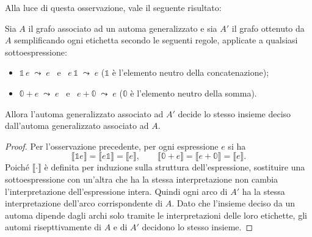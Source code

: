 Alla luce di questa osservazione, vale il seguente risultato:
\begin{prop}
Sia $A$ il grafo associato ad un automa 
generalizzato e sia $A'$ il grafo ottenuto da $A$
semplificando ogni etichetta secondo le seguenti regole, applicate a
qualsiasi sottoespressione:
\begin{itemize}
    \item $\mathbb 1\, e \;\leadsto\; e$ \ e \ $e\, \mathbb 1 \;\leadsto\; e$
          \quad ($\mathbb 1$ è l'elemento neutro della concatenazione);
    \item $\mathbb 0 + e \;\leadsto\; e$ \ e \ $e + \mathbb 0 \;\leadsto\; e$
          \quad ($\mathbb 0$ è l'elemento neutro della somma).
\end{itemize}
Allora l'automa generalizzato associato ad $A'$ decide lo stesso insieme
deciso dall'automa generalizzato associato ad $A$.
\begin{proof}
Per l'osservazione precedente, per ogni espressione $e$ si ha
\[
\llbracket \mathbb 1 e \rrbracket
= \llbracket e \mathbb 1 \rrbracket
= \llbracket e \rrbracket,
\qquad
\llbracket \mathbb 0 + e \rrbracket
= \llbracket e + \mathbb 0 \rrbracket
= \llbracket e \rrbracket .
\]
Poiché $\llbracket \cdot \rrbracket$ è definita per induzione sulla
struttura dell'espressione, sostituire una sottoespressione con
un'altra che ha la stessa interpretazione non cambia l'interpretazione
dell'espressione intera. Quindi ogni arco di $A'$ ha la stessa
interpretazione dell'arco corrispondente di $A$. Dato che l'insieme
deciso da un automa dipende dagli archi solo tramite le
interpretazioni delle loro etichette, gli automi
risepttivamente di $A$ e di $A'$ decidono lo stesso
insieme.
\end{proof}
\end{prop}

